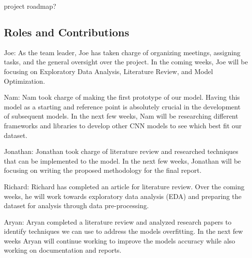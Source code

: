 \documentclass[conference]{IEEEtran}
\begin{document}
project roadmap? 

\subsection{Roles and Contributions}

Joe: As the team leader, Joe has taken charge of organizing meetings, assigning tasks, and the general oversight over the project. In the coming weeks, Joe will be focusing on Exploratory Data Analysis, Literature Review, and Model Optimization. 

Nam: Nam took charge of making the first prototype of our model. Having this model as a starting and reference point is absolutely crucial in the development of subsequent models. In the next few weeks, Nam will be researching different frameworks and libraries to develop other CNN models to see which best fit our dataset.

Jonathan: Jonathan took charge of literature review and researched techniques that can be implemented to the model. In the next few weeks, Jonathan will be focusing on writing the proposed methodology for the final report.

Richard: Richard has completed an article for literature review. Over the coming weeks, he will work towards exploratory data analysis (EDA) and preparing the dataset for analysis through data pre-processing.

Aryan: Aryan completed a literature review and analyzed research papers to identify techniques we can use to address the models overfitting. In the next few weeks Aryan will continue working to improve the models accuracy while also working on documentation and reports. 
\end{document}
